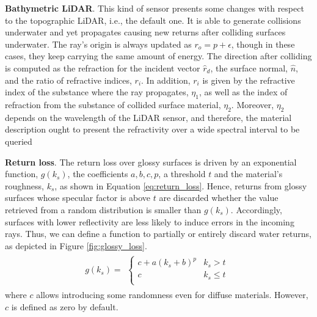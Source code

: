 \textbf{Bathymetric LiDAR}. This kind of sensor presents some changes with respect to the topographic LiDAR, i.e., the default one. It is able to generate collisions underwater and yet propagates causing new returns after colliding surfaces underwater. The ray's origin is always updated as $r_{o} = p + \epsilon$, though in these cases, they keep carrying the same amount of energy. The direction after colliding is computed as the refraction for the incident vector $\hat{r}_{d}$, the surface normal, $\hat{n}$, and the ratio of refractive indices, $r_{i}$. In addition, $r_{i}$ is given by the refractive index of the substance where the ray propagates, $\eta_{1}$, as well as the index of refraction from the substance of collided surface material, $\eta_{2}$. Moreover, $\eta_{2}$ depends on the wavelength of the LiDAR sensor, and therefore, the material description ought to present the refractivity over a wide spectral interval to be queried

\textbf{Return loss}. The return loss over glossy surfaces is driven by an exponential function, $g(k_{s})$, the coefficients $a, b, c, p$, a threshold $\textit{t}$ and the material's roughness, $k_s$, as shown in Equation \ref{eq:return_loss}. Hence, returns from glossy surfaces whose specular factor is above $\textit{t}$ are discarded whether the value retrieved from a random distribution is smaller than $g(k_{s})$. Accordingly, surfaces with lower reflectivity are less likely to induce errors in the incoming rays. Thus, we can define a function to partially or entirely discard water returns, as depicted in Figure \ref{fig:glossy_loss}. 
\begin{gather}
    \label{eq:return_loss}
    g(k_{s}) = \begin{aligned}
        \begin{cases}
            c + a (k_{s} + b) ^ {p} &k_{s} > \textit{t}\\
            c &k_{s} \leq \textit{t}\\
        \end{cases}
    \end{aligned}
\end{gather}
where $c$ allows introducing some randomness even for diffuse materials. However, $c$ is defined as zero by default.

